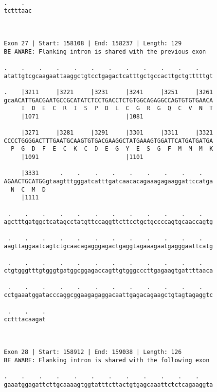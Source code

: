 \documentclass{article}
\begin{document}
\begin{Verbatim}
  
.    .  
tctttaac
        
        
 
Exon 27 | Start: 158108 | End: 158237 | Length: 129
BE AWARE: Flanking intron is shared with the previous exon
 
.    .    .    .    .    .    .    .    .    .    .    .    
atattgtcgcaagaattaaggctgtcctgagactcatttgctgccacttgctgtttttgt
                                                            
.    |3211     |3221     |3231     |3241     |3251     |3261
gcaACATTGACGAATGCCGCATATCTCCTGACCTCTGTGGCAGAGGCCAGTGTGTGAACA
     I  D  E  C  R  I  S  P  D  L  C  G  R  G  Q  C  V  N  T
     |1071                         |1081                    
  
     |3271     |3281     |3291     |3301     |3311     |3321
CCCCTGGGGACTTTGAATGCAAGTGTGACGAAGGCTATGAAAGTGGATTCATGATGATGA
  P  G  D  F  E  C  K  C  D  E  G  Y  E  S  G  F  M  M  M  K
     |1091                         |1101                    
  
     |3331      .    .    .    .    .    .    .    .    .   
AGAACTGCATGGgtaagtttgggatcatttgatcaacacagaaagagaaggattccatga
  N  C  M  D                                                
     |1111                                                  
  
 .    .    .    .    .    .    .    .    .    .    .    .   
agctttgatggctcatagcctatgttccaggttcttcctgctgccccagtgcaaccagtg
                                                            
 .    .    .    .    .    .    .    .    .    .    .    .   
aagttaggaatcagtctgcaacagagggagactgaggtagaaagaatgagggaattcatg
                                                            
 .    .    .    .    .    .    .    .    .    .    .    .   
ctgtgggtttgtgggtgatggcggagaccagttgtgggcccttgagaagtgattttaaca
                                                            
 .    .    .    .    .    .    .    .    .    .    .    .   
cctgaaatggatacccaggcggaagagaggacaattgagacagaagctgtagtagaggtc
                                                            
 .    .    .
cctttacaagat
            
            
 
Exon 28 | Start: 158912 | End: 159038 | Length: 126
BE AWARE: Flanking intron is shared with the following exon
 
.    .    .    .    .    .    .    .    .    .    .    .    
gaaatggagattcttgcaaaagtggtatttcttactgtgagcaaattctctcagaaggta
                                                            

\end{Verbatim}
\end{document}
